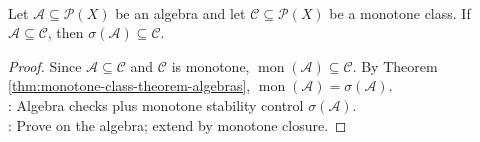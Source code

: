 \begin{corollary} \label{cor:monotone-class-algebra-test} \\
Let $\mathcal{A}\subseteq\mathcal{P}(X)$ be an algebra and let $\mathcal{C}\subseteq\mathcal{P}(X)$ be a monotone class. If $\mathcal{A}\subseteq\mathcal{C}$, then $\sigma(\mathcal{A})\subseteq\mathcal{C}$.
\begin{proof} Since $\mathcal{A}\subseteq\mathcal{C}$ and $\mathcal{C}$ is monotone, $\operatorname{mon}(\mathcal{A})\subseteq\mathcal{C}$. By Theorem \ref{thm:monotone-class-theorem-algebras}, $\operatorname{mon}(\mathcal{A})=\sigma(\mathcal{A})$.\\
: Algebra checks plus monotone stability control $\sigma(\mathcal{A})$.\\
: Prove on the algebra; extend by monotone closure.
\end{proof}
\end{corollary}
